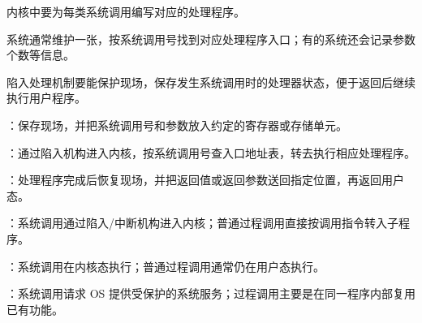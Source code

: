 \begin{points}
  \item 内核中要为每类系统调用编写对应的处理程序。
  \item 系统通常维护一张，按系统调用号找到对应处理程序入口；有的系统还会记录参数个数等信息。
  \item 陷入处理机制要能保护现场，保存发生系统调用时的处理器状态，便于返回后继续执行用户程序。
\end{points}

\begin{points}
  \item {}：保存现场，并把系统调用号和参数放入约定的寄存器或存储单元。
  \item {}：通过陷入机构进入内核，按系统调用号查入口地址表，转去执行相应处理程序。
  \item {}：处理程序完成后恢复现场，并把返回值或返回参数送回指定位置，再返回用户态。
\end{points}

\begin{points}
  \item {}：系统调用通过陷入/中断机构进入内核；普通过程调用直接按调用指令转入子程序。
  \item {}：系统调用在内核态执行；普通过程调用通常仍在用户态执行。
  \item {}：系统调用请求 OS 提供受保护的系统服务；过程调用主要是在同一程序内部复用已有功能。
\end{points}


